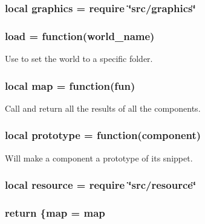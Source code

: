 \hypertarget{world_8lua_aae06ace8bee01f93d02dfaa4436de916}{
\subsubsection[{graphics}]{\setlength{\rightskip}{0pt plus 5cm}local graphics = require \char`\"{}src/graphics\char`\"{}}}\label{world_8lua_aae06ace8bee01f93d02dfaa4436de916}
\hypertarget{world_8lua_adaadec1ef48bb32b80ea5572e7d12ca6}{
\subsubsection[{load}]{\setlength{\rightskip}{0pt plus 5cm}load = function(world\-\_\-name)}}\label{world_8lua_adaadec1ef48bb32b80ea5572e7d12ca6}


Use to set the world to a specific folder. 

\hypertarget{world_8lua_a39ec1e5339699aba0ebc7e3bb83856e7}{
\subsubsection[{map}]{\setlength{\rightskip}{0pt plus 5cm}local map = function(fun)}}\label{world_8lua_a39ec1e5339699aba0ebc7e3bb83856e7}


Call and return all the results of all the components. 

\hypertarget{world_8lua_adce4dc6841964c7ca862c109ca993b97}{
\subsubsection[{prototype}]{\setlength{\rightskip}{0pt plus 5cm}local prototype = function(component)}}\label{world_8lua_adce4dc6841964c7ca862c109ca993b97}


Will make a component a prototype of its snippet. 

\hypertarget{world_8lua_a24ad487107aaa56bef35825abbe9773d}{
\subsubsection[{resource}]{\setlength{\rightskip}{0pt plus 5cm}local resource = require \char`\"{}src/resource\char`\"{}}}\label{world_8lua_a24ad487107aaa56bef35825abbe9773d}
\hypertarget{world_8lua_a9717e7bbecb906637e86cef6da3d83c2}{
\subsubsection[{return}]{\setlength{\rightskip}{0pt plus 5cm}return \{{\bf map} = {\bf map}}}\label{world_8lua_a9717e7bbecb906637e86cef6da3d83c2}


